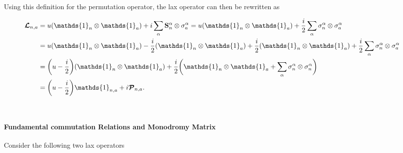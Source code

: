 \documentclass{homework}
\begin{document}
Using this definition for the permutation operator, the lax operator can then be rewritten as

\begin{equation}
    \begin{split}
       \bm{\mathcal{L}}_{n, a} &= u(\mathds{1}_n \otimes \mathds{1}_a) + i \sum_{\alpha} \spin_n^\alpha \otimes \sigma_{a}^\alpha = u(\mathds{1}_n \otimes \mathds{1}_a) + \frac{i}{2} \sum_{\alpha} \sigma_n^\alpha \otimes \sigma_{a}^\alpha \\
       &= u(\mathds{1}_n \otimes \mathds{1}_a) - \frac{i}{2} (\mathds{1}_n \otimes \mathds{1}_a) + \frac{i}{2} (\mathds{1}_n \otimes \mathds{1}_a) + \frac{i}{2} \sum_{\alpha} \sigma_n^\alpha \otimes \sigma_{a}^\alpha \\
       &= \bigg(u-\frac{i}{2}\bigg) (\mathds{1}_n \otimes \mathds{1}_a) + \frac{i}{2} \bigg( \mathds{1}_n \otimes \mathds{1}_a + \sum_{\alpha}\sigma_n^{\alpha}  \otimes \sigma_n^{\alpha} \bigg) \\
       &= \bigg(u-\frac{i}{2}\bigg) \mathds{1}_{n, a} + i \bm{\mathcal{P}}_{n, a}.
       \end{split}
       \label{l-matrix def}
\end{equation}

\blanky \\

\paragraph{\textbf{Fundamental commutation Relations and Monodromy Matrix}}

Consider the following two lax operators
\end{document}
